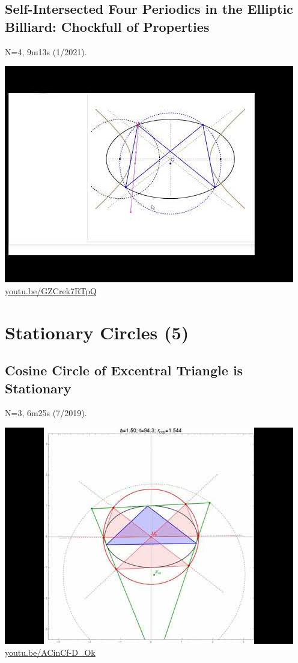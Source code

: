 \documentclass[12pt]{amsart}
\begin{document}
\subsection{Self-Intersected Four Periodics in the Elliptic Billiard: Chockfull of Properties}
\label{vid:GZCrek7RTpQ}
\noindent N=4, 9m13s (1/2021). 
\begin{center}\includegraphics[width=.5\textwidth]{pics/GZCrek7RTpQ.jpg} \\ 
\href{https://youtu.be/GZCrek7RTpQ}{\url{youtu.be/GZCrek7RTpQ}}\end{center}
% 

\section{Stationary Circles (5)}

\subsection{Cosine Circle of Excentral Triangle is Stationary}
\label{vid:ACinCf-D_Ok}
\noindent N=3, 6m25s (7/2019). 
\begin{center}\includegraphics[width=.5\textwidth]{pics/ACinCf-D_Ok.jpg} \\ 
\href{https://youtu.be/ACinCf-D_Ok}{\url{youtu.be/ACinCf-D\_Ok}}\end{center}
% 
\end{document}
